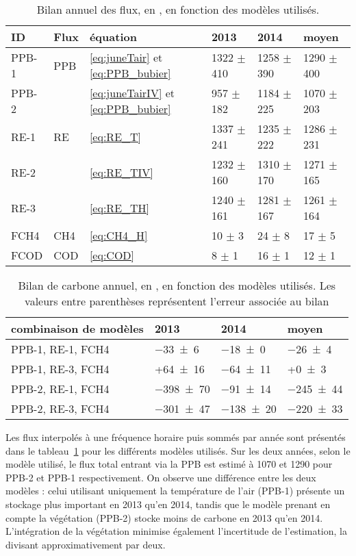 \begin{table}
\centering
\caption{Bilan annuel des flux, en \si{\gcma}, en fonction des modèles utilisés.}
\label{table:flux}
\begin{tabular}{llllll}\toprule
ID & Flux & équation & 2013 & 2014 & moyen \\ \midrule
PPB-1 & PPB & \ref{eq:juneTair} et \ref{eq:PPB_bubier} & 1322 $\pm$ 410 & 1258 $\pm$ 390 & 1290 $\pm$ 400 \\
PPB-2 & & \ref{eq:juneTairIV} et \ref{eq:PPB_bubier} & 957 $\pm$ 182 & 1184 $\pm$ 225 & 1070 $\pm$ 203 \\[+1.5ex]
RE-1 & RE & \ref{eq:RE_T} & 1337 $\pm$ 241 & 1235 $\pm$ 222 & 1286 $\pm$ 231 \\
RE-2 & & \ref{eq:RE_TIV} & 1232 $\pm$ 160 & 1310 $\pm$ 170 & 1271 $\pm$ 165\\
RE-3 & & \ref{eq:RE_TH} & 1240 $\pm$ 161 & 1281 $\pm$ 167 & 1261 $\pm$ 164 \\[+1.5ex]
FCH4 & CH4 & \ref{eq:CH4_H} & 10 $\pm$ 3 & 24 $\pm$ 8 & 17 $\pm$ 5 \\[+1.5ex]
FCOD & COD & \ref{eq:COD} & 8 $\pm$ 1  & 16 $\pm$ 1 & 12 $\pm$ 1 \\
\bottomrule
\end{tabular}
\end{table}


\begin{table}
\centering
\caption{Bilan de carbone annuel, en \si{\gcma}, en fonction des modèles utilisés. Les valeurs entre parenthèses représentent l'erreur associée au bilan}
\label{table:bdc}
\begin{tabular}{llll}\toprule
combinaison de modèles & 2013 & 2014 & moyen \\ \midrule
PPB-1, RE-1, FCH4 &  \num{-33(6)} & \num{-18(0)} & \num{-26(4)} \\
PPB-1, RE-3, FCH4 &  +\num{64(16)} & \num{-64(11)} & +\num{0(3)} \\
PPB-2, RE-1, FCH4 &  \num{-398(70)} & \num{-91(14)} & \num{-245(44)} \\
PPB-2, RE-3, FCH4 &  \num{-301(47)} & \num{-138(20)} & \num{-220(33)} \\
\bottomrule
\end{tabular}
\end{table}

Les flux interpolés à une fréquence horaire puis sommés par année sont présentés dans le tableau~\ref{table:flux} pour les différents modèles utilisés.
Sur les deux années, selon le modèle utilisé, le flux total entrant via la PPB est estimé à 1070 et \SI{1290}{\gcma} pour PPB-2 et PPB-1 respectivement.
On observe une différence entre les deux modèles : 
celui utilisant uniquement la température de l'air (PPB-1) présente un stockage plus important en 2013 qu'en 2014, tandis que le modèle prenant en compte la végétation (PPB-2) stocke moins de carbone en 2013 qu'en 2014.
L'intégration de la végétation minimise également l'incertitude de l'estimation, la divisant approximativement par deux.

